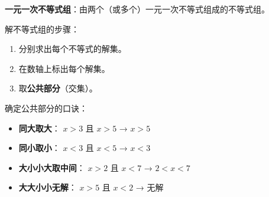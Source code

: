 \begin{understand}


\textbf{一元一次不等式组}：由两个（或多个）一元一次不等式组成的不等式组。

解不等式组的步骤：

\begin{enumerate}
  \item 分别求出每个不等式的解集。
  \item 在数轴上标出每个解集。
  \item 取\textbf{公共部分}（交集）。
\end{enumerate}


确定公共部分的口诀：

\begin{itemize}
  \item \textbf{同大取大}： $x > 3$ 且 $x > 5$ → $x > 5$
  \item \textbf{同小取小}： $x < 3$ 且 $x < 5$ → $x < 3$
  \item \textbf{大小小大取中间}： $x > 2$ 且 $x < 7$ → $2 < x < 7$
  \item \textbf{大大小小无解}： $x > 5$ 且 $x < 2$ → 无解
\end{itemize}


\end{understand}


